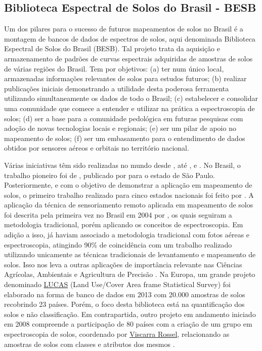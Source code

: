 \subsection*{Biblioteca Espectral de Solos do Brasil - BESB}

Um dos pilares para o sucesso de futuros mapeamentos de solos no Brasil é a montagem de bancos de dados de espectros de solos, aqui denominada Biblioteca Espectral de Solos do Brasil (BESB). Tal projeto trata da aquisição e armazenamento de padrões de curvas espectrais adquiridas de amostras de solos de várias regiões do Brasil. Tem por objetivos: (a) ter num único local, armazenadas informações relevantes de solos para estudos futuros; (b) realizar publicações iniciais demonstrando a utilidade desta poderosa ferramenta utilizando simultaneamente os dados de todo o Brasil; (c) estabelecer e consolidar uma comunidade que comece a entender e utilizar na prática a espectroscopia de solos; (d) ser a base para a comunidade pedológica em futuras pesquisas com adoção de novas tecnologias locais e regionais; (e) ser um pilar de apoio no mapeamento de solos; (f) ser um embasamento para o entendimento de dados obtidos por sensores aéreos e orbitais no território nacional.

Várias iniciativas têm sido realizadas no mundo desde \citet{StonerEtAl:1981}, até \citet{ShepherdEtAl:2002}, e \citet{BrownEtAl:2006}. No Brasil, o trabalho pioneiro foi de \citet{EpiphanioEtAl:1992}, publicado por \citet{FormaggioEtAl:1996} para o estado de São Paulo. Posteriormente, e com o objetivo de demonstrar a aplicação em mapeamento de solos, o primeiro trabalho realizado para cinco estados nacionais foi feito por \citet{BellinasoEtAl:2010}. A aplicação da técnica de sensoriamento remoto aplicada em mapeamento de solos foi descrita pela primeira vez no Brasil em 2004 por \citet{DematteEtAl:2004}, os quais seguiram a metodologia tradicional, porém aplicando os conceitos de espectroscopia. Em adição a isso, \citet{DematteEtAl:2001} já haviam associado a metodologia tradicional com fotos aéreas e espectroscopia, atingindo 90\% de coincidência com um trabalho realizado utilizando unicamente as técnicas tradicionais de levantamento e mapeamento de solos. Isso nos leva a outras aplicações de importância relevante nas Ciências Agrícolas, Ambientais e Agricultura de Precisão \citep{ThomassonEtAl:2001, OdlareEtAl:2005}. Na Europa, um grande projeto denominado \href{http://eusoils.jrc.ec.europa.eu/projects/Lucas/}{LUCAS} (Land Use/Cover Area frame Statistical Survey) foi elaborado na forma de banco de dados em 2013 com 20.000 amostras de solos recobrindo 23 países. Porém, o foco desta biblioteca está na quantificação dos solos e não classificação. Em contrapartida, outro projeto em andamento iniciado em 2008 compreende a participação de 80 países com a criação de um grupo em espectroscopia de solos, coordenado por \href{http://groups.google.com/group/soil-spectroscopy}{Viscarra Rossel}, relacionando as amostras de solos com classes e atributos dos mesmos \citep{ViscarraRossel:2009}.

